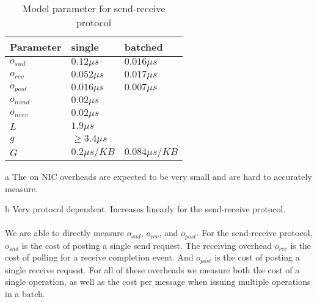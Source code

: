 \begin{table}[!ht]
\setlength\tabcolsep{1.5pt}
\centering
\caption{Model parameter for send-receive protocol}
\label{tab:model}
\begin{threeparttable}[t]
 \begin{tabular}{|x{3.5cm}|x{3.5cm}|x{3.5cm}|} %
 \hline
 Parameter    &  single & batched \\
  \hline
  \hline
 $o_{snd}$    & $0.12 \mu s$ &  $0.016 \mu s$\\
  \hline
 $o_{rcv}$    & $0.052 \mu s$ & $0.017 \mu s$\\
  \hline
 $o_{post}$   & $0.016 \mu s$ & $0.007 \mu s$\\
  \hline
 $o_{nsnd}$   & $0.02 \mu s$ &   \\
  \hline
 $o_{nrcv}$   & $0.02 \mu s$ &   \\
  \hline
 $L$          & $1.9 \mu s$ &  \\
  \hline
 $g$          & $\geq 3.4 \mu s$  & \\
 \hline
 $G$          & $0.2\mu s / KB$  & $0.084\mu s / KB$\\

\hline
\end{tabular}
\begin{tablenotes}
\item[a] \small The on NIC overheads are expected to be very small and are hard to accurately measure.
\item[b] \small Very protocol dependent. Increases linearly for the send-receive protocol.
\end{tablenotes}
\end{threeparttable}
\end{table}


\paragraph{} We are able to directly measure $o_{snd}$, $o_{rcv}$, and $o_{post}$. For the send-receive protocol, $o_{snd}$ is the cost of 
posting a single send request. The receiving overhead $o_{rcv}$ is the cost of polling for a receive completion event. And
$o_{post}$ is the cost of posting a single receive request. For all of these overheads we measure both the cost of a single
operation, as well as the cost per message when issuing multiple operations in a batch.

